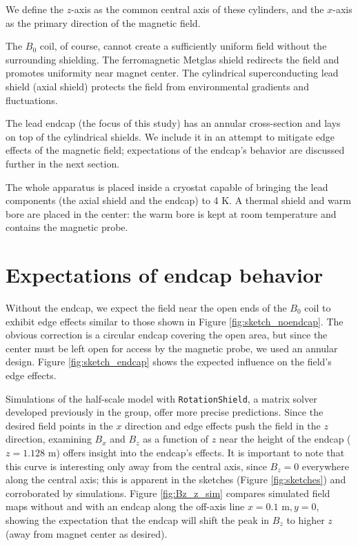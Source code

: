 \documentclass[twocolumn,aps,prb,citeautoscript]{revtex4-1}
\begin{document}
We define the $z$-axis as the common central axis of these cylinders, and the $x$-axis as the primary direction
of the magnetic field.

The $B_0$ coil, of course, cannot create a sufficiently uniform field without the surrounding shielding.
The ferromagnetic Metglas shield redirects the field and promotes uniformity near magnet center. The cylindrical
superconducting lead shield (axial shield) protects the field from environmental gradients and fluctuations.

The lead endcap (the focus of this study) has an annular cross-section and lays on top of the cylindrical
shields. We include it in an attempt to mitigate edge effects of the magnetic field;
expectations of the endcap's behavior are discussed further in the next section.

The whole apparatus is placed inside a cryostat capable of bringing the lead components (the axial shield and
the endcap) to 4 K. A thermal shield and warm bore are placed in the center: the warm bore is kept at room
temperature and contains the magnetic probe.

\section{Expectations of endcap behavior}

Without the endcap, we expect the field near the open ends of the $B_0$ coil to exhibit edge effects similar to
those shown in Figure \ref{fig:sketch_noendcap}. The obvious correction is a
circular endcap covering the open area, but since the center must be left open for access by the
magnetic probe, we used an annular design. Figure \ref{fig:sketch_endcap} shows the expected influence on
the field's edge effects.

Simulations of the half-scale model with \texttt{RotationShield}, a matrix solver developed previously in the
group,\cite{rotshield} offer more precise predictions. Since the desired field points in the $x$ direction and
edge effects push the field in the $z$ direction, examining $B_x$ and $B_z$ as a function of $z$ near the
height of the endcap ($z = 1.128$ m) offers insight into the endcap's effects. It is important to note
that this curve is interesting only away from the central axis, since $B_z = 0$ everywhere along the central
axis; this is apparent in the sketches (Figure \ref{fig:sketches}) and corroborated by simulations.
Figure \ref{fig:Bz_z_sim} compares simulated field maps without and with an endcap along the off-axis line
$x = 0.1 \text{ m}, y = 0$,
showing the expectation that the endcap will shift
the peak in $B_z$ to higher $z$ (away from magnet center as desired).
\end{document}
